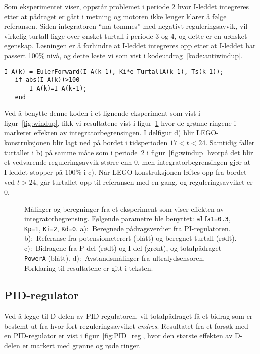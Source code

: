 Som eksperimentet viser, oppstår problemet i periode 2 hvor
I-leddet integreres etter at pådraget er gått i metning og motoren
ikke lenger klarer å følge referansen. 
Siden integratoren ``må tømmes'' med negativt
reguleringsavvik, vil virkelig turtall
ligge over ønsket turtall i periode 3 og 4, og dette er en uønsket
egenskap.  
Løsningen er å forhindre at I-leddet integreres opp
etter at I-leddet har passert 100\% nivå, og dette løste vi som vist i
kodeutdrag~\ref{kode:antiwindup}.
\begin{lstlisting}[caption=Kode for integratorbegrensing i turtallsregulatoren.,
  label=kode:antiwindup, firstnumber=18]
   I_A(k) = EulerForward(I_A(k-1), Ki*e_TurtallA(k-1), Ts(k-1));
   if abs(I_A(k))>100
       I_A(k)=I_A(k-1);
   end
\end{lstlisting}

Ved å benytte denne koden i et lignende eksperiment som vist i
figur~\ref{fig:windup}, fikk vi resultatene vist 
i figur~\ref{fig:PI_anti_reg} hvor de 
grønne ringene i markerer effekten av integratorbegrensingen. I
delfigur d) blir 
LEGO-konstruksjonen blir lagt ned på bordet i tidsperioden $17<t<24$.
Samtidig faller turtallet i b) på samme måte som i periode~2 i
figur~\ref{fig:windup} hvorpå det blir et vedvarende reguleringsavvik
større enn 0,
men integratorbegrensingen gjør at I-leddet stopper på 100\% i
c). Når LEGO-konstruksjonen løftes opp fra bordet ved $t>24$, går
turtallet opp til referansen med en gang, og
reguleringsavviket er 0. 
\begin{figure}[H]
  \centering
  \hspace*{-5mm}
  \caption{Målinger og beregninger fra et eksperiment som viser
    effekten av integratorbegrensing.  Følgende
    parametre ble benyttet: {\tt alfa1=0.3}, {\tt Kp=1}, {\tt Ki=2},
    {\tt Kd=0}.
    a):~Beregnede pådragsverdier fra PI-regulatoren. 
    b):~Referanse fra potensiometerert (blått) og beregnet
    turtall (rødt). 
    c):~Bidragene fra P-del (rødt) og I-del (grønt), og totalpådraget {\tt
      PowerA} (blått). 
    d):~Avstandsmålinger fra ultralydsensoren.
    Forklaring
    til resultatene er gitt i teksten.} 
  \label{fig:PI_anti_reg}
\end{figure}

\subsection{PID-regulator}
Ved å legge til D-delen av PID-regulatoren, vil totalpådraget få et
bidrag som er bestemt ut fra hvor fort reguleringsavviket
{\em endres}. 
Resultatet fra et forsøk med en PID-regulator er vist i
figur~\ref{fig:PID_reg}, hvor den største
effekten av D-delen er markert med
grønne og røde ringer.


